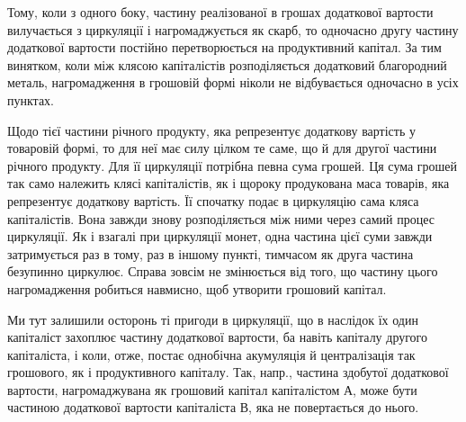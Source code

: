 Тому, коли з одного боку, частину реалізованої в грошах додаткової
вартости вилучається з циркуляції і нагромаджується як скарб, то одночасно
другу частину додаткової вартости постійно перетворюється на
продуктивний капітал. За тим винятком, коли між клясою капіталістів
розподіляється додатковий благородний металь, нагромадження в грошовій
формі ніколи не відбувається одночасно в усіх пунктах.

Щодо тієї частини річного продукту, яка репрезентує додаткову
вартість у товаровій формі, то для неї має силу цілком те саме, що й
для другої частини річного продукту. Для її циркуляції потрібна певна
сума грошей. Ця сума грошей так само належить клясі капіталістів, як
і щороку продукована маса товарів, яка репрезентує додаткову вартість.
Її спочатку подає в циркуляцію сама кляса капіталістів. Вона завжди
знову розподіляється між ними через самий процес циркуляції. Як і взагалі
при циркуляції монет, одна частина цієї суми завжди затримується
раз в тому, раз в іншому пункті, тимчасом як друга частина безупинно
циркулює. Справа зовсім не змінюється від того, що частину цього нагромадження
робиться навмисно, щоб утворити грошовий капітал.

Ми тут залишили осторонь ті пригоди в циркуляції, що в наслідок
їх один капіталіст захоплює частину додаткової вартости, ба навіть
капіталу другого капіталіста, і коли, отже, постає однобічна акумуляція
й централізація так грошового, як і продуктивного капіталу. Так, напр.,
частина здобутої додаткової вартости, нагромаджувана як грошовий
капітал капіталістом А, може бути частиною додаткової вартости капіталіста
В, яка не повертається до нього.
